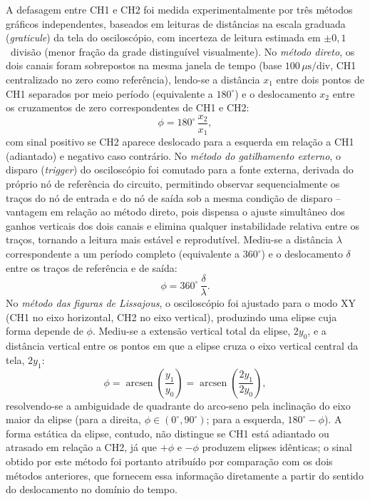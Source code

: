 \documentclass[reprint,amsmath,amssymb,aps,prl,floatfix,onecolumn]{revtex4-2}
\DeclareMathOperator{\arcsen}{arcsen}
\begin{document}
A defasagem entre CH1 e CH2 foi medida experimentalmente por três métodos gráficos independentes, baseados em leituras de distâncias na escala graduada (\emph{graticule}) da tela do osciloscópio, com incerteza de leitura estimada em $\pm0{,}1$~divisão (menor fração da grade distinguível visualmente). No \emph{método direto}, os dois canais foram sobrepostos na mesma janela de tempo (base $100\,\mu\text{s/div}$, CH1 centralizado no zero como referência), lendo-se a distância $x_1$ entre dois pontos de CH1 separados por meio período (equivalente a $180^\circ$) e o deslocamento $x_2$ entre os cruzamentos de zero correspondentes de CH1 e CH2:
\begin{equation}
	\label{eq:metodo_direto}
	\phi=180^\circ\,\frac{x_2}{x_1},
\end{equation}
com sinal positivo se CH2 aparece deslocado para a esquerda em relação a CH1 (adiantado) e negativo caso contrário. No \emph{método do gatilhamento externo}, o disparo (\emph{trigger}) do osciloscópio foi comutado para a fonte externa, derivada do próprio nó de referência do circuito, permitindo observar sequencialmente os traços do nó de entrada e do nó de saída sob a mesma condição de disparo -- vantagem em relação ao método direto, pois dispensa o ajuste simultâneo dos ganhos verticais dos dois canais e elimina qualquer instabilidade relativa entre os traços, tornando a leitura mais estável e reprodutível. Mediu-se a distância $\lambda$ correspondente a um período completo (equivalente a $360^\circ$) e o deslocamento $\delta$ entre os traços de referência e de saída:
\begin{equation}
	\label{eq:metodo_gatilhamento}
	\phi=360^\circ\,\frac{\delta}{\lambda}.
\end{equation}
No \emph{método das figuras de Lissajous}, o osciloscópio foi ajustado para o modo XY (CH1 no eixo horizontal, CH2 no eixo vertical), produzindo uma elipse cuja forma depende de $\phi$. Mediu-se a extensão vertical total da elipse, $2y_0$, e a distância vertical entre os pontos em que a elipse cruza o eixo vertical central da tela, $2y_1$:
\begin{equation}
	\label{eq:metodo_lissajous}
	\phi=\arcsen\left(\frac{y_1}{y_0}\right)=\arcsen\left(\frac{2y_1}{2y_0}\right),
\end{equation}
resolvendo-se a ambiguidade de quadrante do arco-seno pela inclinação do eixo maior da elipse (para a direita, $\phi\in(0^\circ,90^\circ)$; para a esquerda, $180^\circ-\phi$). A forma estática da elipse, contudo, não distingue se CH1 está adiantado ou atrasado em relação a CH2, já que $+\phi$ e $-\phi$ produzem elipses idênticas; o sinal obtido por este método foi portanto atribuído por comparação com os dois métodos anteriores, que fornecem essa informação diretamente a partir do sentido do deslocamento no domínio do tempo.
\end{document}
